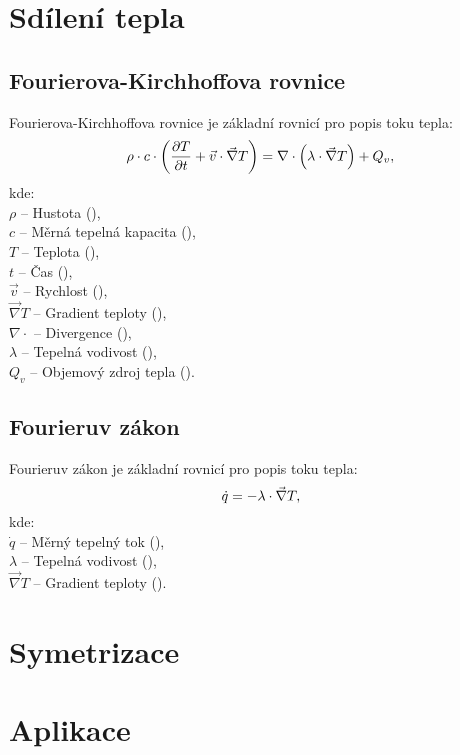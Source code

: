 \documentclass{article}
\begin{document}
\newpage




\section{Sdílení tepla}



\subsection{Fourierova-Kirchhoffova rovnice}
Fourierova-Kirchhoffova rovnice je základní rovnicí pro popis toku tepla:
\begin{equation}
    \rho \cdot c \cdot \left( \frac{\partial T}{\partial t} + \vec{v} \cdot \vec{\nabla} T \right) = \nabla \cdot \left( \lambda \cdot \vec{\nabla} T \right) + Q_v,
    \tagaddtext{(\ueqWandMinvcu)}
\end{equation}
kde:\\
$\rho$ -- Hustota (\ueqKGandMinvcu),\\
$c$ -- Měrná tepelná kapacita (\ueqJandKGinvKinv),\\
$T$ -- Teplota (\ueqK),\\
$t$ -- Čas (\ueqS),\\
$\vec{v}$ -- Rychlost (\ueqMandSinv),\\
$\vec{\nabla} T$ -- Gradient teploty (\ueqKandMinv),\\
$\nabla \cdot$ -- Divergence (\ueqMinv),\\
$\lambda$ -- Tepelná vodivost (\ueqWandMinvKinv),\\
$Q_v$ -- Objemový zdroj tepla (\ueqWandMinvcu).



\subsection{Fourieruv zákon}
Fourieruv zákon je základní rovnicí pro popis toku tepla:
\begin{equation}
    \dot{q} = - \lambda \cdot \vec{\nabla} T,
    \tagaddtext{(\ueqWandMinvsq)}
\end{equation}
kde:\\
$\dot{q}$ -- Měrný tepelný tok (\ueqWandMinvsq),\\
$\lambda$ -- Tepelná vodivost (\ueqWandMinvKinv),\\
$\vec{\nabla} T$ -- Gradient teploty (\ueqKandMinv).

\newpage




\section{Symetrizace}

\newpage



\section{Aplikace}
\end{document}
